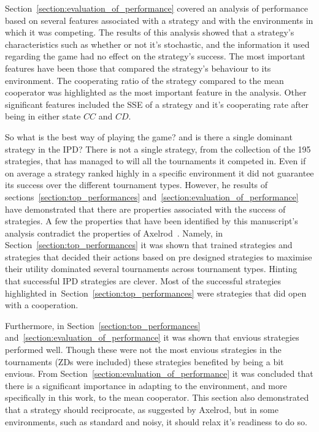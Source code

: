 \documentclass{article}
\begin{document}
Section~\ref{section:evaluation_of_performance} covered an analysis of
performance based on several features associated with a strategy and with the
environments in which it was competing. The results of this analysis showed that a
strategy's characteristics such as whether or not it's stochastic, and the information it
used regarding the game had no effect on the strategy's success. The most
important features have been those that compared the strategy's behaviour to its
environment. The cooperating ratio of the strategy compared to the mean
cooperator was highlighted as the most important feature in the analysis.
Other significant features included the SSE of a strategy and it's cooperating
rate after being in either state \(CC\) and \(CD\).

So what is the best way of playing the game? and is there a single dominant
strategy in the IPD? There is not a single strategy, from the collection of the
195 strategies, that has managed to will all the tournaments it competed in.
Even if on average a strategy ranked highly in a specific environment it did not
guarantee its success over the different tournament types. However, he results
of sections~\ref{section:top_performances}
and~\ref{section:evaluation_of_performance} have demonstrated that there are
properties associated with the success of strategies. A few the properties that
have been identified by this manuscript's analysis contradict the properties of
Axelrod~\cite{Axelrod1981}. Namely, in Section~\ref{section:top_performances} it
was shown that trained strategies and strategies that decided their actions
based on pre designed strategies to maximise their utility dominated several
tournaments across tournament types. Hinting that successful IPD strategies are
clever. Most of the successful strategies highlighted
in~Section~\ref{section:top_performances} were strategies that did open with a
cooperation.

Furthermore, in Section~\ref{section:top_performances}
and~\ref{section:evaluation_of_performance} it was shown that envious strategies
performed well. Though these were not the most envious strategies in the
tournaments (ZDs were included) these strategies benefited by being a bit
envious. From Section~\ref{section:evaluation_of_performance} it was concluded
that there is a significant importance in adapting to the environment, and more
specifically in this work, to the mean cooperator. This section also
demonstrated that a strategy should reciprocate, as suggested by Axelrod, but in
some environments, such as standard and noisy, it should relax it's readiness to
do so.
\end{document}
